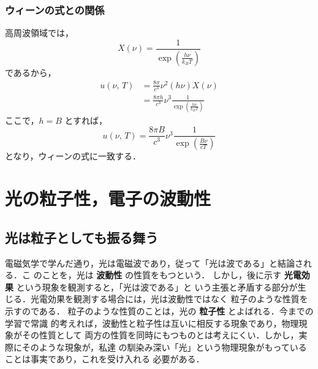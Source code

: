             \subsubsection{ウィーンの式との関係}
            高周波領域では，
            \begin{equation*}
                X(\nu) = \frac{1}{\exp\left(\frac{h\nu}{{k}_{B}T}\right)}
            \end{equation*}
            であるから，
            \begin{align*}
                u(\nu,\,T) &= \frac{8 \pi}{{c}^{3}} {\nu}^{2} (h \nu) X(\nu) \\
                           &= \frac{8 \pi h}{{c}^{3}} {\nu}^{3} \frac{1}{\exp\left(\frac{h\nu}{{k}_{B}T}\right)}
            \end{align*}
            ここで，$h=B$ とすれば，
            \begin{equation*}
                u(\nu,\,T) = \frac{8 \pi B}{{c}^{3}} {\nu}^{3} \frac{1}{\exp\left(\frac{B\nu}{cT}\right)}
            \end{equation*}
            となり，ウィーンの式に一致する．

    \section{光の粒子性，電子の波動性}
        \subsection{光は粒子としても振る舞う}
            電磁気学で学んだ通り，光は電磁波であり，従って「光は波である」と結論される．こ
            のことを，光は \textbf{波動性} の性質をもつという．
            しかし，後に示す \textbf{光電効果} という現象を観測すると，「光は波である」と
            いう主張と矛盾する部分が生じる．光電効果を観測する場合には，光は波動性ではなく
            粒子のような性質を示すのである．
            粒子のような性質のことは，光の \textbf{粒子性} とよばれる．今までの学習で常識
            的考えれば，波動性と粒子性は互いに相反する現象であり，物理現象がその性質として
            両方の性質を同時にもつものとは考えにくい．しかし，実際にそのような現象が，私達
            の馴染み深い「光」という物理現象がもっていることは事実であり，これを受け入れる
            必要がある．

